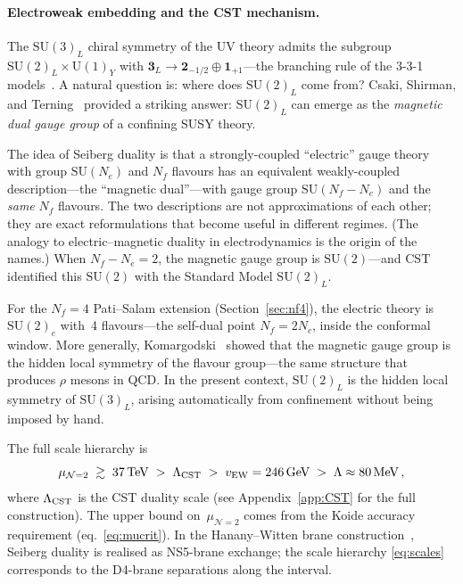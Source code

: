 \documentclass[12pt,a4paper]{article}
\newcommand{\SU}{\mathrm{SU}}
\newcommand{\UU}{\mathrm{U}}
\newcommand{\Nf}{N_f}
\newcommand{\Nc}{N_c}
\newcommand{\MeV}{\,\mathrm{MeV}}
\newcommand{\GeV}{\,\mathrm{GeV}}
\newcommand{\TeV}{\,\mathrm{TeV}}
\begin{document}
\paragraph{Electroweak embedding and the CST mechanism.}
The $\SU(3)_L$ chiral symmetry of the UV theory admits the subgroup
$\SU(2)_L \times \UU(1)_Y$ with $\mathbf{3}_L \to \mathbf{2}_{-1/2}
\oplus \mathbf{1}_{+1}$---the branching rule of the 3-3-1
models~\cite{SingerValleSchechter:1980,PisanoPleitez:1992,Frampton:1992}.
A natural question is: where does $\SU(2)_L$ come from?
Csaki, Shirman, and Terning~\cite{Csaki:2011xn} provided a striking
answer: $\SU(2)_L$ can emerge as the \emph{magnetic dual gauge group}
of a confining SUSY theory.

The idea of Seiberg duality is that a strongly-coupled ``electric''
gauge theory with group $\SU(N_e)$ and $\Nf$ flavours has an
equivalent weakly-coupled description---the ``magnetic dual''---with
gauge group $\SU(\Nf - N_e)$ and the \emph{same} $\Nf$ flavours.
The two descriptions are not approximations of each other; they
are exact reformulations that become useful in different regimes.
(The analogy to electric--magnetic duality in electrodynamics is
the origin of the names.)  When $\Nf - N_e = 2$, the magnetic gauge
group is $\SU(2)$---and CST identified this $\SU(2)$ with the
Standard Model $\SU(2)_L$.

For the $\Nf=4$ Pati--Salam extension (Section~\ref{sec:nf4}), the
electric theory is $\SU(2)_e$ with~4 flavours---the self-dual point
$\Nf = 2\Nc$, inside the conformal window.
More generally, Komargodski~\cite{Komargodski:2010}
showed that the magnetic gauge group is the hidden local symmetry of
the flavour group---the same structure that produces $\rho$ mesons in
QCD. In the present context, $\SU(2)_L$ is the hidden local symmetry
of $\SU(3)_L$, arising automatically from confinement without being
imposed by hand.

The full scale hierarchy is
\begin{equation}
  \mu_{\mathcal{N}=2} \;\gtrsim\; 37\TeV
  \;>\; \Lambda_{\rm CST}
  \;>\; v_{\rm EW} = 246\GeV
  \;>\; \Lambda \approx 80\MeV\,,
  \label{eq:scales}
\end{equation}
where $\Lambda_{\rm CST}$ is the CST duality scale (see
Appendix~\ref{app:CST} for the full construction).
The upper bound on~$\mu_{\mathcal{N}=2}$ comes from the Koide accuracy
requirement (eq.~\ref{eq:mucrit}).
In the Hanany--Witten brane
construction~\cite{HananyWitten:1997}, Seiberg duality is realised as
NS5-brane exchange; the scale hierarchy
\eqref{eq:scales} corresponds to the D4-brane separations along
the interval.
\end{document}
